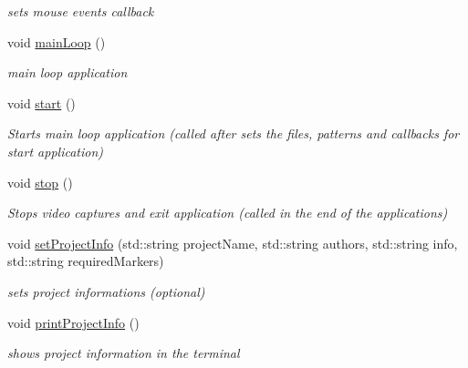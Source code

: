 \begin{DoxyCompactItemize}
\begin{DoxyCompactList}\small\item\em sets mouse events callback \end{DoxyCompactList}\item 
\hypertarget{classavr_application_a582980be4415041999d879ddc79cd326}{void \hyperlink{classavr_application_a582980be4415041999d879ddc79cd326}{main\-Loop} ()}\label{classavr_application_a582980be4415041999d879ddc79cd326}

\begin{DoxyCompactList}\small\item\em main loop application \end{DoxyCompactList}\item 
\hypertarget{classavr_application_ac9ca425be51b316bba545440a8c0db1c}{void \hyperlink{classavr_application_ac9ca425be51b316bba545440a8c0db1c}{start} ()}\label{classavr_application_ac9ca425be51b316bba545440a8c0db1c}

\begin{DoxyCompactList}\small\item\em Starts main loop application (called after sets the files, patterns and callbacks for start application) \end{DoxyCompactList}\item 
\hypertarget{classavr_application_a5fad6efc429d79c8e956833e03eda670}{void \hyperlink{classavr_application_a5fad6efc429d79c8e956833e03eda670}{stop} ()}\label{classavr_application_a5fad6efc429d79c8e956833e03eda670}

\begin{DoxyCompactList}\small\item\em Stops video captures and exit application (called in the end of the applications) \end{DoxyCompactList}\item 
void \hyperlink{classavr_application_a3132d9cf3eeb1eb75988c3e99f9aabe4}{set\-Project\-Info} (std\-::string project\-Name, std\-::string authors, std\-::string info, std\-::string required\-Markers)
\begin{DoxyCompactList}\small\item\em sets project informations (optional) \end{DoxyCompactList}\item 
\hypertarget{classavr_application_a1a2c0c94b3251b39e478b769cf3abaca}{void \hyperlink{classavr_application_a1a2c0c94b3251b39e478b769cf3abaca}{print\-Project\-Info} ()}\label{classavr_application_a1a2c0c94b3251b39e478b769cf3abaca}

\begin{DoxyCompactList}\small\item\em shows project information in the terminal \end{DoxyCompactList}\end{DoxyCompactItemize}
